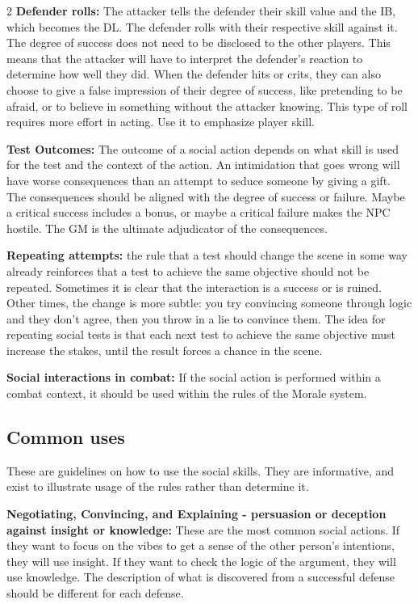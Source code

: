 \begin{multicols}{2}
\textbf{Defender rolls:} The attacker tells the defender their skill value and the IB, which becomes the DL. The defender rolls with their respective skill against it. The degree of success does not need to be disclosed to the other players. This means that the attacker will have to interpret the defender's reaction to determine how well they did. When the defender hits or crits, they can also choose to give a false impression of their degree of success, like pretending to be afraid, or to believe in something without the attacker knowing. This type of roll requires more effort in acting. Use it to emphasize player skill.

\textbf{Test Outcomes:} The outcome of a social action depends on what skill is used for the test and the context of the action. An intimidation that goes wrong will have worse consequences than an attempt to seduce someone by giving a gift. The consequences should be aligned with the degree of success or failure. Maybe a critical success includes a bonus, or maybe a critical failure makes the NPC hostile. The GM is the ultimate adjudicator of the consequences.

\textbf{Repeating attempts:} the rule that a test should change the scene in some way already reinforces that a test to achieve the same objective should not be repeated. Sometimes it is clear that the interaction is a success or is ruined. Other times, the change is more subtle: you try convincing someone through logic and they don't agree, then you throw in a lie to convince them. The idea for repeating social tests is that each next test to achieve the same objective must increase the stakes, until the result forces a chance in the scene.

\textbf{Social interactions in combat:} If the social action is performed within a combat context, it should be used within the rules of the Morale system.

\subsection{Common uses}

These are guidelines on how to use the social skills. They are informative, and exist to illustrate usage of the rules rather than determine it.  

\textbf{Negotiating, Convincing, and Explaining - persuasion or deception against insight or knowledge:} These are the most common social actions. If they want to focus on the vibes to get a sense of the other person's intentions, they will use insight. If they want to check the logic of the argument, they will use knowledge. The description of what is discovered from a successful defense should be different for each defense.  


\end{multicols}
